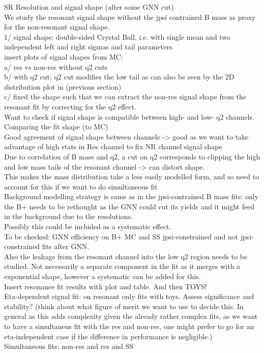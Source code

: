 SR Resolution and signal shape (after some GNN cut)\\

We study the resonant signal shape without the jpsi contrained B mass
as proxy for the non-resonant signal shape.\\
1/ signal shape: double-sided Crystal Ball, i.e. with single mean and two independent
left and right sigmas and tail parameters.\\
insert plots of signal shapes from MC:\\
a/ res vs non-res without q2 cuts\\
b/ with q2 cut: q2 cut modifies the low tail as can also be seen by the 2D distribution plot in (previous section)\\
c/ fixed the shape such that we can extract the non-res signal shape from the resonant fit by correcting for the q2 effect.\\

Want to check if signal shape is compatible between high- and low- q2 channels. Comparing the fit shape (to MC)\\
Good agreement of signal shape between channels -> good as we want to take advantage of high stats in Res channel to fix NR channel signal shape\\
Due to correlation of B mass and q2, a cut on q2 corresponds to clipping the high and low mass tails of the resonant channel -> can distort shape.\\
This makes the mass distribution take a less easily modelled form, and so need to account for this if we want to do simultaneous fit\\

Background modelling strategy is same as in the jpsi-contrained B mass
fits: only the B+ needs to be rethought as the GNN could cut its
yields and it might feed in the background due to the resolutions.\\
Possibly this could be included as a systematic effect.\\
To be checked: GNN efficiency on B+ MC and SS jpsi-constrained and
not jpsi-constrained fits after GNN.\\

Also the leakage from the resonant channel into the low q2 region
needs to be studied. Not necessarily a separate component in the fit
as it merges with a exponential shape, however a systematic can be
added for this.\\

Insert resonance fit results with plot and table. And then TOYS!\\

Eta-dependent signal fit: on resonant only fits with toys. Assess significance
and stability? (think about what figure of merit we want to use to
decide this. In general as this adds complexity given the already
rather complex fits, as we want to have a simultaneus fit with the res and
non-res, one might prefer to go for an eta-independent case if the difference
in performance is negligible.)\\

Simultaneous fits: non-res and res and SS

